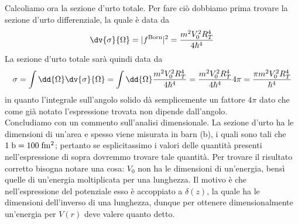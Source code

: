 \begin{soluzione}
   Calcoliamo ora la sezione d'urto totale. Per fare ciò dobbiamo prima trovare la sezione d'urto differenziale, la quale è data da
   \begin{equation*}
      \dv{\sigma}{\Omega}
      =|f^{\rm Born}|^2
      =\frac{m^2 V_0^2 R_T^4}{4 \hbar^4}
   \end{equation*}
   La sezione d'urto totale sarà quindi data da
   \begin{equation*}
      \sigma
      =\int \dd{\Omega} \dv{\sigma}{\Omega}
      =\int \dd{\Omega} \frac{m^2 V_0^2 R_T^4}{4 \hbar^4}
      =\frac{m^2 V_0^2 R_T^4}{4 \hbar^4} 4\pi
      =\frac{\pi m^2 V_0^2 R_T^4}{\hbar^4}
   \end{equation*}
   in quanto l'integrale sull'angolo solido dà semplicemente un fattore $4\pi$ dato che come già notato l'espressione trovata non dipende dall'angolo.\\
   Concludiamo con un commento sull'analisi dimensionale. La sezione d'urto ha le dimensioni di un'area e spesso viene misurata in barn (b), i quali sono tali che $\rm 1 \; b=100 \; fm^2$; pertanto se esplicitassimo i valori delle quantità presenti nell'espressione di sopra dovremmo trovare tale quantità. Per trovare il risultato corretto bisogna notare una cosa: $V_0$ non ha le dimensioni di un'energia, bensì quelle di un'energia moltiplicata per una lunghezza. Il motivo è che nell'espressione del potenziale esso è accoppiato a $\delta(z)$, la quale ha le dimensioni dell'inverso di una lunghezza, dunque per ottenere dimensionalmente un'energia per $V(r)$ deve valere quanto detto.
\end{soluzione}

\newpage
\setcounter{equation}{0}

